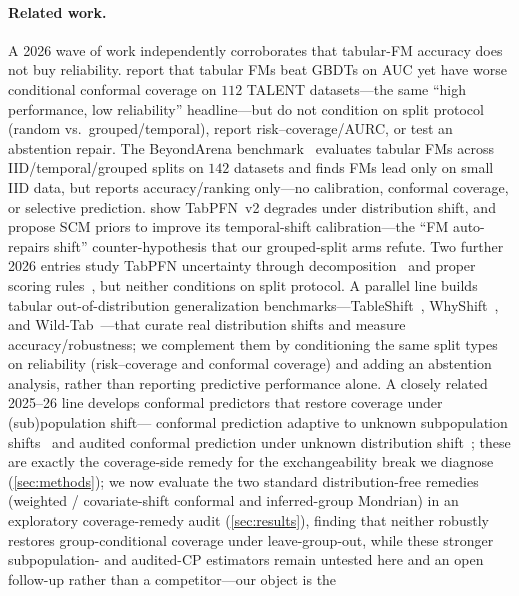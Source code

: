 \documentclass[11pt]{article}
\begin{document}
\paragraph{Related work.} A 2026 wave of work independently corroborates that tabular-FM accuracy does not buy
reliability. \citet{tfm_uncertainty_esann2026} report that tabular FMs beat GBDTs on AUC yet have worse
conditional conformal coverage on $112$ TALENT datasets---the same ``high performance, low reliability''
headline---but do not condition on split protocol (random vs.\ grouped/temporal), report risk--coverage/AURC,
or test an abstention repair. The BeyondArena benchmark~\citep{beyondiid2026} evaluates tabular FMs across
IID/temporal/grouped splits on $142$ datasets and finds FMs lead only on small IID data, but reports
accuracy/ranking only---no calibration, conformal coverage, or selective prediction.
\citet{tabpfn_openenv2025} show TabPFN~v2 degrades under distribution shift, and \citet{helli2024driftresilient}
propose SCM priors to improve its temporal-shift calibration---the ``FM auto-repairs shift'' counter-hypothesis
that our grouped-split arms refute. Two further 2026 entries study TabPFN uncertainty through
decomposition~\citep{tabpfn_uncdecomp2026} and proper scoring rules~\citep{distreg_tfm2026}, but neither
conditions on split protocol. A parallel line builds tabular out-of-distribution generalization
benchmarks---TableShift~\citep{gardner2023tableshift}, WhyShift~\citep{whyshift2023}, and
Wild-Tab~\citep{wildtab2023}---that curate real distribution shifts and measure accuracy/robustness;
we complement them by conditioning the same split types on reliability (risk--coverage and conformal
coverage) and adding an abstention analysis, rather than reporting predictive performance alone. A closely
related 2025--26 line develops conformal predictors that restore coverage under (sub)population shift---
conformal prediction adaptive to unknown subpopulation shifts~\citep{subpop2025conformal} and audited conformal
prediction under unknown distribution shift~\citep{audited2026conformal}; these are exactly the coverage-side
remedy for the exchangeability break we diagnose (\cref{sec:methods}); we now evaluate the two standard
distribution-free remedies (weighted / covariate-shift conformal and inferred-group Mondrian) in an
exploratory coverage-remedy audit (\cref{sec:results}), finding that neither robustly restores
group-conditional coverage under leave-group-out, while these stronger subpopulation- and audited-CP
estimators remain untested here and an open follow-up rather than a competitor---our object is the
\end{document}
